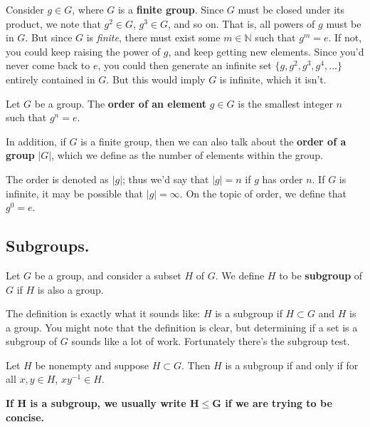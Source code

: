\documentclass[12pt,letterpaper]{algebra_book}
\theoremstyle{definition}
\begin{document}
{\color{MidnightBlue}
Consider $g \in G$, where $G$ is a \textbf{finite group}. Since $G$ must be
closed under its product, we note that $g^2 \in G$, $g^3 \in G$, and so
on. That is, all powers of $g$ must be in $G$. But since $G$ is
\textit{finite}, there must exist some $m \in
\mathbb{N}$ such that $g^m = e$. If not, you could keep raising the
power of $g$, and keep getting new elements. Since you'd never come
back to $e$, you could then generate an infinite set
$\{g, g^2, g^3, g^4, \dots\}$ entirely contained in $G$. But this
would imply $G$ is infinite, which it isn't.}

\noindent
\begin{definition}
    Let $G$ be a group. The \textbf{order of an element} $g \in G$ is
    the smallest integer $n$ such that $g^n = e$. 

    In addition, if $G$ is a finite group, then we can also talk about
    the \textbf{order of a group} $|G|$, which we define as the number of
    elements within the group.
    
    The order is denoted
    as $|g|$; thus we'd say that $|g| = n$ if $g$ has order $n$. If
    $G$ is infinite, it may be possible that $|g| = \infty$. On the
    topic of order, we define that $g^0 = e$.
\end{definition}
\subsection*{Subgroups.}
    \begin{definition}
        Let $G$ be a group, and consider a subset $H$ of $G$. We define
    $H$ to be \textbf{subgroup} of $G$ if $H$ is also a group.
    \end{definition}
    
    {\color{blue}The definition is exactly what it sounds like: $H$ is a subgroup
    if $H \subset G$ and $H$ is a group. You might note that the
    definition is clear, but determining if a set is a subgroup of $G$
    sounds like a lot of work. Fortunately there's the subgroup test.
    }

    \begin{thm}\label{subgroup_test}
        Let $H$ be nonempty and suppose $H \subset G$. Then $H$ is a
        subgroup if and only if for all $x, y \in H$, $xy^{-1} \in H$.
    \end{thm}

    
    

    \noindent \textbf{If $\mathbf{H}$ is a subgroup, we usually write $\mathbf{H \le G}$ if we
    are trying to be concise.}
\end{document}
